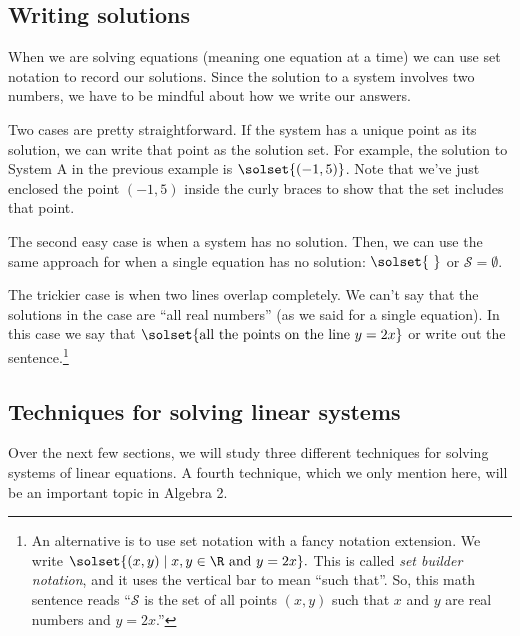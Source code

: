 \subsection{Writing solutions}

When we are solving equations (meaning one equation at a time) we can use set notation to record our solutions. Since the solution to a system involves two numbers, we have to be mindful about how we write our answers.

Two cases are pretty straightforward. If the system has a unique point as its solution, we can write that point as the solution set. For example, the solution to System A in the previous example is $\solset{(-1,5)}$. Note that we've just enclosed the point $(-1,5)$ inside the curly braces to show that the set includes that point.

The second easy case is when a system has no solution. Then, we can use the same approach for when a single equation has no solution: $\solset{~}$ or $\mathcal{S}=\emptyset$.

The trickier case is when two lines overlap completely. We can't say that the solutions in the case are ``all real numbers'' (as we said for a single equation). In this case we say that $\solset{\text{all the points on the line }y=2x}$ or write out the sentence.\footnote{An alternative is to use set notation with a fancy notation extension. We write $\solset{(x,y) \mid x, y \in \R \text{ and } y=2x}.$ This is called \textit{set builder notation}, and it uses the vertical bar to mean ``such that''. So, this math sentence reads ``$\mathcal{S}$ is the set of all points $(x,y)$ such that $x$ and $y$ are real numbers and $y=2x$.''}


\subsection{Techniques for solving linear systems}

Over the next few sections, we will study three different techniques for solving systems of linear equations. A fourth technique, which we only mention here, will be an important topic in Algebra 2.

